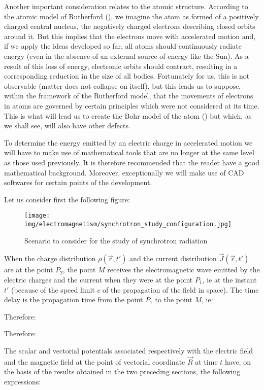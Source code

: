 	Another important consideration relates to the atomic structure. According to the atomic model of Rutherford (), we imagine the atom as formed of a positively charged central nucleus, the negatively charged electrons describing closed orbits around it. But this implies that the electrons move with accelerated motion and, if we apply the ideas developed so far, all atoms should continuously radiate energy (even in the absence of an external source of energy like the Sun). As a result of this loss of energy, electronic orbits should contract, resulting in a corresponding reduction in the size of all bodies. Fortunately for us, this is not observable (matter does not collapse on itself), but this leads us to suppose, within the framework of the Rutherford model, that the movements of electrons in atoms are governed by certain principles which were not considered at its time. This is what will lead us to create the Bohr model of the atom () but which, as we shall see, will also have other defects.

	To determine the energy emitted by an electric charge in accelerated motion we will have to make use of mathematical tools that are no longer at the same level as those used previously. It is therefore recommended that the reader have a good mathematical background. Moreover, exceptionally we will make use of CAD softwares for certain points of the development.

	Let us consider first the following figure:
	\begin{figure}[H]
		\centering
		\texttt{[image: img/electromagnetism/synchrotron\_study\_configuration.jpg]}
		\caption[]{Scenario to consider for the study of synchrotron radiation}
	\end{figure}
	When the charge distribution $\rho(\vec{r},t')$ and the current distribution $\vec{J}(\vec{r},t')$ are at the point $P_2$, the point $M$ receives the electromagnetic wave emitted by the electric charges and the current when they were at the point $P_1$, ie at the instant $t'$ (because of the speed limit $c$ of the propagation of the field in space). The time delay is the propagation time from the point $P_1$ to the point $M$, ie:
	
	Therefore:
	
	Therefore:
		
	The scalar and vectorial potentials associated respectively with the electric field and the magnetic field at the point of vectorial coordinate $\vec{R}$ at time $t$ have, on the basis of the results obtained in the two preceding sections, the following expressions:
	
